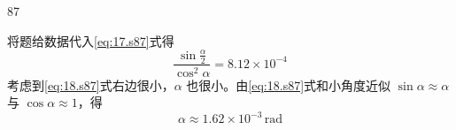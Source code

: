 \begin{solution}{87}
\begin{subsolution}
\begin{subsubsolution}
        \end{subsubsolution}
        \begin{subsubsolution}
            将题给数据代入\eqref{eq:17.s87}式得
            \begin{equation}
                \frac{\sin\frac{\alpha}{2}}{\cos^{2}\alpha} = 8.12 \times 10^{-4}
                \label{eq:18.s87}
            \end{equation}
            考虑到\eqref{eq:18.s87}式右边很小，$\alpha$ 也很小。由\eqref{eq:18.s87}式和小角度近似 $\sin\alpha\approx\alpha$ 与 $\cos\alpha\approx1$，得
            \begin{equation}
                \alpha \approx 1.62 \times 10^{-3}\,\mathrm{rad}
                \label{eq:19.s87}
            \end{equation}
        \end{subsubsolution}
    \end{subsolution}
\end{solution}
